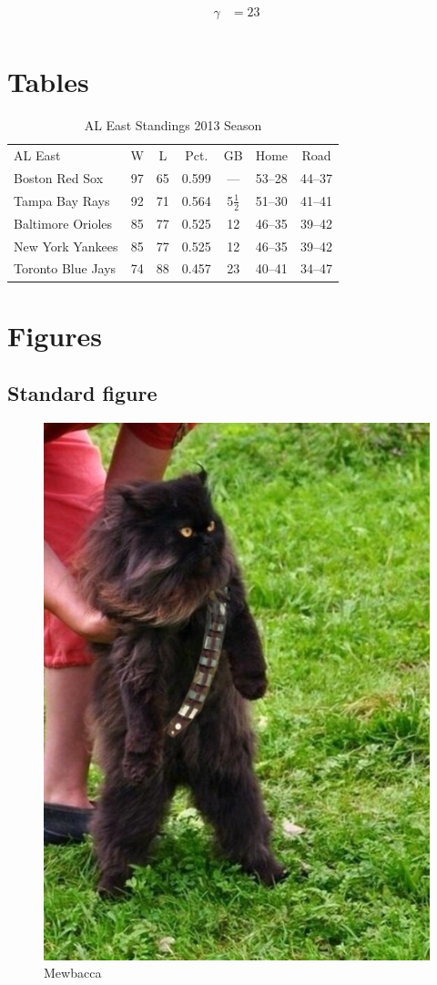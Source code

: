 \documentclass[12pt,a4paper]{article}
\begin{document}
  \begin{align}
    \gamma &= 23 \\
  \end{align}

\newpage

  \section{Tables}
    \begin{table}[ht!]
      \centering
        \begin{tabular}{lcccccc}
          AL East & W & L & Pct. & GB & Home & Road \\
          Boston Red Sox & 97 & 65 & 0.599 & — & 53–28 & 44–37\\
          Tampa Bay Rays & 92 & 71 & 0.564 & 5$\frac{1}{2}$ & 51–30 & 41–41\\
          Baltimore Orioles & 85 & 77 & 0.525 & 12 & 46–35 & 39–42\\
          New York Yankees & 85 & 77 & 0.525 & 12 & 46–35 & 39–42\\
          Toronto Blue Jays & 74 & 88 & 0.457 & 23 & 40–41 & 34–47\\
        \end{tabular}
      \caption{AL East Standings 2013 Season\label{tab:aleast2013}}
    \end{table}

    \clearpage

\section{Figures}
    \subsection{Standard figure}

    \begin{figure}[ht!]
      \centering
      \includegraphics[width=.5\textwidth]{mewbacca.jpg}
      \caption{Mewbacca \label{fig:mewbacca}}
    \end{figure}
   
\end{document}
